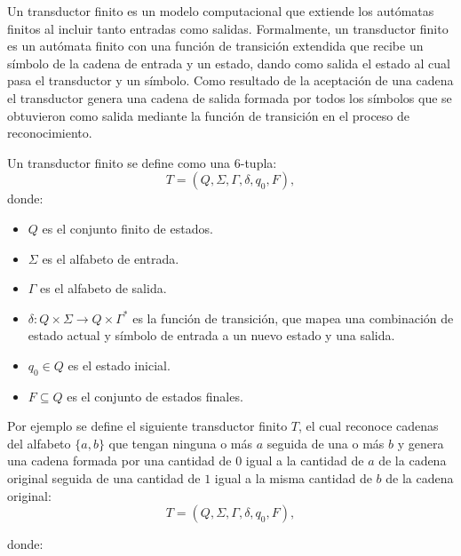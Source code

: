 Un transductor finito \cite{geeksforgeeks_finite_state_transducer} es un modelo computacional que extiende los autómatas finitos al incluir tanto entradas como salidas.  
Formalmente, un transductor finito es un autómata finito con una función de transición extendida que recibe un símbolo de la cadena de entrada y un estado, dando como
salida el estado al cual pasa el transductor y un símbolo. Como resultado de la aceptación de una cadena el transductor
genera una cadena de salida formada por todos los símbolos que se obtuvieron como salida mediante la función de transición
en el proceso de reconocimiento.

Un transductor finito se define como una 6-tupla:
\[
      T = (Q, \Sigma, \Gamma, \delta, q_0, F),
\]
donde:
\begin{itemize}
      \item \(Q\) es el conjunto finito de estados.
      \item \(\Sigma\) es el alfabeto de entrada.
      \item \(\Gamma\) es el alfabeto de salida.
      \item \(\delta: Q \times \Sigma \to Q \times \Gamma^*\) es la función de transición, que mapea una combinación de estado actual y símbolo de entrada a un nuevo estado y una salida.
      \item \(q_0 \in Q\) es el estado inicial.
      \item \(F \subseteq Q\) es el conjunto de estados finales.
\end{itemize}

Por ejemplo se define el siguiente transductor finito $T$, el cual reconoce cadenas del alfabeto $\{a,b\}$
que tengan ninguna o más $a$ seguida de una o más $b$ y genera una cadena formada por una cantidad de $0$ igual
a la cantidad de $a$ de la cadena original seguida de una cantidad de $1$ igual a la misma cantidad de $b$ de
la cadena original:
\[
      T = (Q, \Sigma, \Gamma, \delta, q_0, F),
\]

donde:

